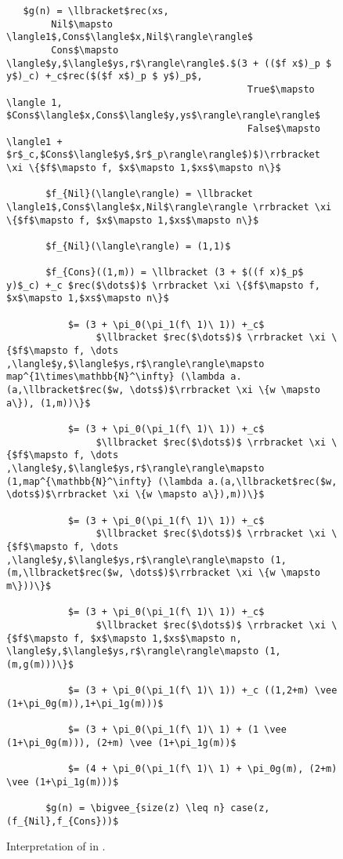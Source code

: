\begin{figure}[H]
  \caption{Interpretation of  in .}
  \label{fig:interp_sizes_outer_rec}
  \begin{lstlisting}
   $g(n) = \llbracket$rec(xs,
        Nil$\mapsto \langle1$,Cons$\langle$x,Nil$\rangle\rangle$
        Cons$\mapsto \langle$y,$\langle$ys,r$\rangle\rangle$.$(3 + (($f x$)_p $ y$)_c) +_c$rec($($f x$)_p $ y$)_p$,
                                           True$\mapsto \langle 1, $Cons$\langle$x,Cons$\langle$y,ys$\rangle\rangle\rangle$
                                           False$\mapsto \langle1 + $r$_c,$Cons$\langle$y$,$r$_p\rangle\rangle$)$)\rrbracket \xi \{$f$\mapsto f, $x$\mapsto 1,$xs$\mapsto n\}$

       $f_{Nil}(\langle\rangle) = \llbracket \langle1$,Cons$\langle$x,Nil$\rangle\rangle \rrbracket \xi \{$f$\mapsto f, $x$\mapsto 1,$xs$\mapsto n\}$

       $f_{Nil}(\langle\rangle) = (1,1)$

       $f_{Cons}((1,m)) = \llbracket (3 + $((f x)$_p$ y)$_c) +_c $rec($\dots$)$ \rrbracket \xi \{$f$\mapsto f,  $x$\mapsto 1,$xs$\mapsto n\}$

           $= (3 + \pi_0(\pi_1(f\ 1)\ 1)) +_c$
                $\llbracket $rec($\dots$)$ \rrbracket \xi \{$f$\mapsto f, \dots ,\langle$y,$\langle$ys,r$\rangle\rangle\mapsto map^{1\times\mathbb{N}^\infty} (\lambda a.(a,\llbracket$rec($w, \dots$)$\rrbracket \xi \{w \mapsto a\}), (1,m))\}$

           $= (3 + \pi_0(\pi_1(f\ 1)\ 1)) +_c$
                $\llbracket $rec($\dots$)$ \rrbracket \xi \{$f$\mapsto f, \dots ,\langle$y,$\langle$ys,r$\rangle\rangle\mapsto (1,map^{\mathbb{N}^\infty} (\lambda a.(a,\llbracket$rec($w, \dots$)$\rrbracket \xi \{w \mapsto a\}),m))\}$

           $= (3 + \pi_0(\pi_1(f\ 1)\ 1)) +_c$
                $\llbracket $rec($\dots$)$ \rrbracket \xi \{$f$\mapsto f, \dots ,\langle$y,$\langle$ys,r$\rangle\rangle\mapsto (1,(m,\llbracket$rec($w, \dots$)$\rrbracket \xi \{w \mapsto m\}))\}$

           $= (3 + \pi_0(\pi_1(f\ 1)\ 1)) +_c$
                $\llbracket $rec($\dots$)$ \rrbracket \xi \{$f$\mapsto f, $x$\mapsto 1,$xs$\mapsto n, \langle$y,$\langle$ys,r$\rangle\rangle\mapsto (1,(m,g(m)))\}$

           $= (3 + \pi_0(\pi_1(f\ 1)\ 1)) +_c ((1,2+m) \vee (1+\pi_0g(m)),1+\pi_1g(m)))$

           $= (3 + \pi_0(\pi_1(f\ 1)\ 1) + (1 \vee (1+\pi_0g(m))), (2+m) \vee (1+\pi_1g(m))$

           $= (4 + \pi_0(\pi_1(f\ 1)\ 1) + \pi_0g(m), (2+m) \vee (1+\pi_1g(m)))$

       $g(n) = \bigvee_{size(z) \leq n} case(z, (f_{Nil},f_{Cons}))$
  \end{lstlisting}
\end{figure}

